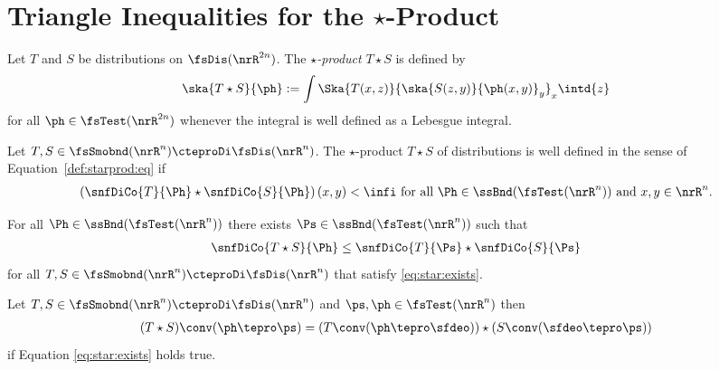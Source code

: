 \section{Triangle Inequalities for the $\star$-Product}
\label{tri}

\begin{definition}
    Let $ T $ and $ S $ be distributions on $ \fsDis( \nrR^{2n} ) $.
    The {\em $\star$-product} $ T \star S $ is defined by
    \begin{align}
        \ska{ T \star S }{ \ph }
        :=
        \int \Ska{ T( x, z ) }{ \ska{ S( z, y ) }{ \ph( x, y ) }_y }_x \intd{ z }
        \label{def:starprod:eq}
    \end{align}
    for all $ \ph \in \fsTest( \nrR^{2n} ) $ whenever the integral is well defined
    as a Lebesgue integral.
\end{definition}

\begin{conjecture}
    Let $ T, S \in \fsSmobnd(\nrR^n) \cteproDi \fsDis(\nrR^n) $.
    The $\star$-product $ T \star S $ of distributions
    is well defined in the sense of Equation~\eqref{def:starprod:eq} if
    \begin{align}
        \left( \snfDiCo{ T }{ \Ph } \star \snfDiCo{ S }{ \Ph } \right)( x, y )
        <
        \infi
        ~\text{for all $ \Ph \in \ssBnd(\fsTest(\nrR^n)) $
        and $ x, y \in \nrR^n $.}
        \label{eq:star:exists}
    \end{align}
\end{conjecture}

\begin{conjecture}
    For all $ \Ph \in \ssBnd(\fsTest(\nrR^n)) $
    there exists $ \Ps \in \ssBnd(\fsTest(\nrR^n)) $ such that
    \begin{align}
        \snfDiCo{ T \star S }{ \Ph }
        \leq
        \snfDiCo{ T }{ \Ps } \star \snfDiCo{ S }{ \Ps }
        \label{eq:star:ineq}
    \end{align}
    for all $ T, S \in \fsSmobnd(\nrR^n) \cteproDi \fsDis(\nrR^n) $
    that satisfy \eqref{eq:star:exists}.
\end{conjecture}

\begin{lemma}
    Let $ T, S \in \fsSmobnd(\nrR^n) \cteproDi \fsDis(\nrR^n) $
    and $ \ps,\ph \in \fsTest(\nrR^n) $ then
    \begin{align}
        ( T \star S ) \conv ( \ph \tepro \ps )
        =
        ( T \conv ( \ph \tepro \sfdeo ) ) \star ( S \conv ( \sfdeo \tepro \ps ) )
    \end{align}
    if Equation \eqref{eq:star:exists} holds true.
\end{lemma}

